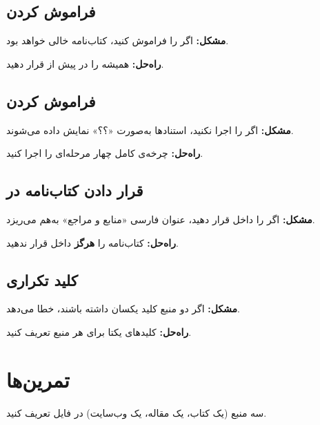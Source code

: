 \subsection{فراموش کردن }
\label{sec:bibliography-mistake-addbibresource}

\textbf{مشکل:} اگر  را فراموش
کنید، کتاب‌نامه خالی خواهد بود.

\textbf{راه‌حل:} همیشه  را
در پیش از  قرار دهید.

\subsection{فراموش کردن }
\label{sec:bibliography-mistake-biber}

\textbf{مشکل:} اگر  را اجرا نکنید،
استنادها به‌صورت «؟؟» نمایش داده می‌شوند.

\textbf{راه‌حل:} چرخه‌ی کامل چهار مرحله‌ای را
اجرا کنید.

\subsection{قرار دادن کتاب‌نامه در }
\label{sec:bibliography-mistake-latin}

\textbf{مشکل:} اگر  را
داخل  قرار دهید، عنوان
فارسی «منابع و مراجع» به‌هم می‌ریزد.

\textbf{راه‌حل:} کتاب‌نامه را \textbf{هرگز} داخل
 قرار ندهید.

\subsection{کلید تکراری}
\label{sec:bibliography-mistake-duplicate}

\textbf{مشکل:} اگر دو منبع کلید یکسان داشته
باشند،  خطا می‌دهد.

\textbf{راه‌حل:} کلیدهای یکتا برای هر منبع
تعریف کنید.

\section{تمرین‌ها}
\label{sec:bibliography-exercises}

\begin{exercise}
    سه منبع (یک کتاب، یک مقاله، یک وب‌سایت)
    در فایل  تعریف کنید.
    \label{exc:bibliography-bibfile}
\end{exercise}

